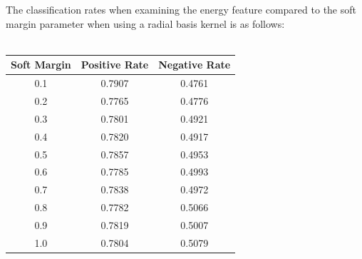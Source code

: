 \documentclass[twoside]{article}
\begin{document}
\begin{multicols}{2}
The classification rates when examining the energy feature
compared to the soft margin parameter when using a radial basis kernel is as follows:\\ \\
\begin{tabular}{|c|c|c|}
	\hline
	Soft Margin 	& Positive Rate & Negative Rate \\ \hline
	0.1		& 0.7907	& 0.4761 \\ \hline
	0.2		& 0.7765	& 0.4776 \\ \hline
	0.3		& 0.7801	& 0.4921 \\ \hline
	0.4		& 0.7820	& 0.4917\\ \hline
	0.5		& 0.7857	& 0.4953\\ \hline
	0.6		& 0.7785	& 0.4993\\ \hline
	0.7		& 0.7838	& 0.4972\\ \hline
	0.8		& 0.7782	& 0.5066\\ \hline
	0.9		& 0.7819	& 0.5007\\ \hline
	1.0		& 0.7804	& 0.5079 \\ \hline
\end{tabular}


\end{multicols}
\end{document}
